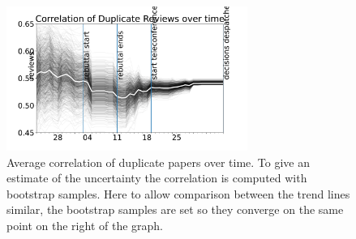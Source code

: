 \begin{Shaded}
\begin{Highlighting}[]
\OperatorTok{=}
\OperatorTok{=}
\end{Highlighting}
\end{Shaded}

\begin{Shaded}
\begin{Highlighting}[]
\OperatorTok{=}\OperatorTok{=}
 \NormalTok{(}\NormalTok{):}
\OperatorTok{=}
\OperatorTok{=}
\OperatorTok{=}
\OperatorTok{=}
\end{Highlighting}
\end{Shaded}

\begin{Shaded}
\begin{Highlighting}[]
\end{Highlighting}
\end{Shaded}

\begin{figure}[htb]
\includegraphics[width=0.70\textwidth]{diagrams/neurips/correlation-duplicate-reviews-bootstrap.pdf}


\caption{Average correlation of duplicate papers over time. To give an estimate of the uncertainty the correlation is computed with bootstrap samples. Here to allow comparison between the trend lines similar, the bootstrap samples are set so they converge on the same point on the right of the graph.}
\label{correlation-duplicate-reviews-bootstrap}
\end{figure}

